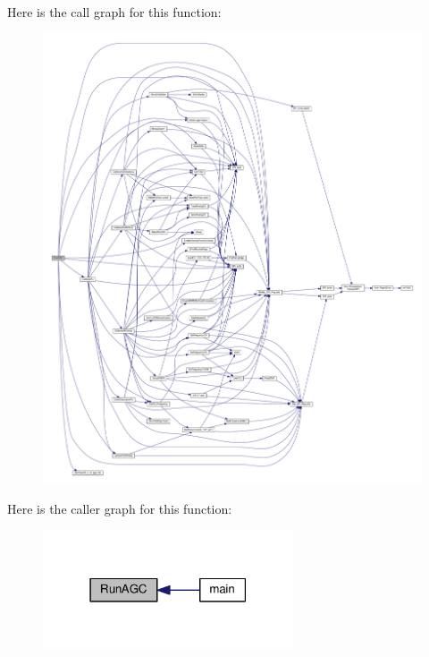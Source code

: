 Here is the call graph for this function\+:
\nopagebreak
\begin{figure}[H]
\begin{center}
\leavevmode
\includegraphics[width=350pt]{d1/dc7/lms7002m__calibrations_8h_adce4a8efb4d0eb17b578b99489f4ef77_cgraph}
\end{center}
\end{figure}




Here is the caller graph for this function\+:
\nopagebreak
\begin{figure}[H]
\begin{center}
\leavevmode
\includegraphics[width=210pt]{d1/dc7/lms7002m__calibrations_8h_adce4a8efb4d0eb17b578b99489f4ef77_icgraph}
\end{center}
\end{figure}


